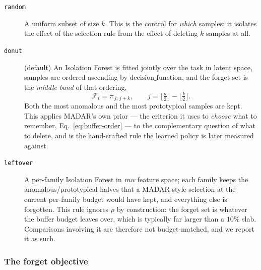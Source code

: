\begin{description}
  \item[\texttt{random}] A uniform subset of size $k$. This is the control for
    \emph{which} samples: it isolates the effect of the selection rule from the
    effect of deleting $k$ samples at all.

  \item[\texttt{donut}] (default) An Isolation Forest is fitted jointly over the
    task in latent space, samples are ordered ascending by
    $\mathrm{decision\_function}$, and the forget set is the \emph{middle band}
    of that ordering,
    \begin{equation}
      \label{eq:donut}
      \mathcal{F}_t = \pi_{\,j:\,j+k},
      \qquad j = \Big\lfloor \tfrac{n}{2} \Big\rfloor - \Big\lfloor \tfrac{k}{2} \Big\rfloor .
    \end{equation}
    Both the most anomalous and the most prototypical samples are kept. This
    applies MADAR's own prior --- the criterion it uses to \emph{choose} what to
    remember, Eq.~\eqref{eq:buffer-order} --- to the complementary question of
    what to delete, and is the hand-crafted rule the learned policy is later
    measured against.

  \item[\texttt{leftover}] A per-family Isolation Forest in \emph{raw} feature
    space; each family keeps the anomalous/prototypical halves that a
    MADAR-style selection at the current per-family budget would have kept, and
    everything else is forgotten. This rule ignores $\rho$ by construction: the
    forget set is whatever the buffer budget leaves over, which is typically far
    larger than a $10\%$ slab. Comparisons involving it are therefore not
    budget-matched, and we report it as such.
\end{description}

\subsubsection{The forget objective}
\label{sec:method:objective}

